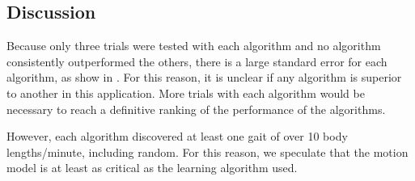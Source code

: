 


\subsection{Discussion}


Because only three trials were tested with each algorithm and no
algorithm consistently outperformed the others, there is a large
standard error for each algorithm, as show in . For
this reason, it is unclear if any algorithm is superior to another in
this application. More trials with each algorithm would be necessary
to reach a definitive ranking of the performance of the algorithms.

However, each algorithm discovered at least one gait of over 10 body
lengths/minute, including random. For this reason, we speculate that
the motion model is at least as critical as the learning algorithm
used.

